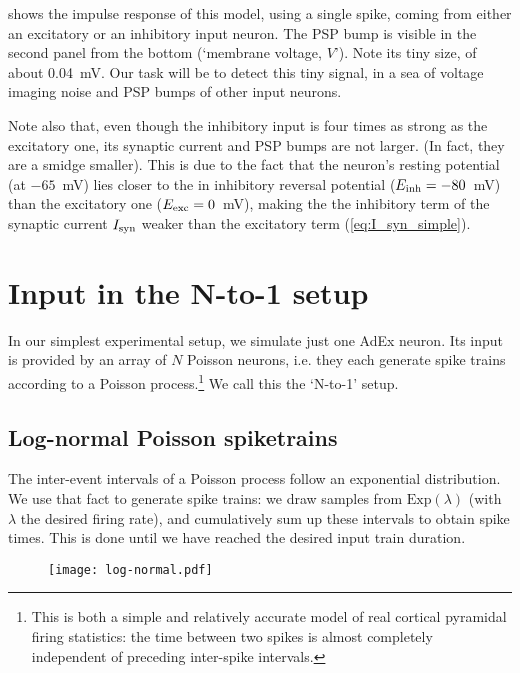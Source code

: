  shows the impulse response of this model, using a single spike, coming from either an excitatory or an inhibitory input neuron. The PSP bump is visible in the second panel from the bottom (`membrane voltage, $V$'). Note its tiny size, of about 0.04~mV. Our task will be to detect this tiny signal, in a sea of voltage imaging noise and PSP bumps of other input neurons.

Note also that, even though the inhibitory input is four times as strong as the excitatory one, its synaptic current and PSP bumps are not larger. (In fact, they are a smidge smaller). This is due to the fact that the neuron's resting potential (at $-65$~mV) lies closer to the in inhibitory reversal potential ($E_{\text{inh}} = -80$~mV) than the excitatory one ($E_{\text{exc}} = 0$~mV), making the the inhibitory term of the synaptic current $I_{\text{syn}}$ weaker than the excitatory term  (\cref{eq:I_syn_simple}).



\FloatBarrier
\section{Input in the N-to-1 setup}
\label{sec:lognormal-poisson-input}

In our simplest experimental setup, we simulate just one AdEx neuron.
Its input is provided by an array of $N$ Poisson neurons, i.e. they each generate spike trains according to a Poisson process.\footnote{
    This is both a simple and relatively accurate model of real cortical pyramidal firing statistics: the time between two spikes is almost completely independent of preceding inter-spike intervals.\cite{Softky1993HighlyIrregularFiringa}
}
We call this the `N-to-1' setup.

\subsection{Log-normal Poisson spiketrains}

The inter-event intervals of a Poisson process follow an exponential distribution.
We use that fact to generate spike trains: we draw samples from $\mathrm{Exp}(\lambda)$ (with $\lambda$ the desired firing rate), and cumulatively sum up these intervals  to obtain spike times. This is done until we have reached the desired input train duration.

\begin{figure}
    \hspace*{-4em}
    \texttt{[image: log-normal.pdf]}
    \label{fig:log-normal}
\end{figure}

